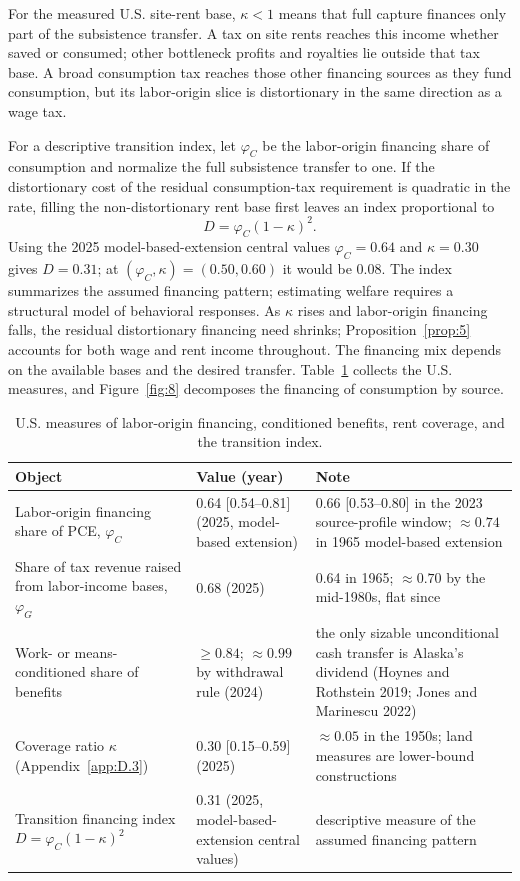 \documentclass[12pt]{article}
\theoremstyle{plain}
\theoremstyle{definition}
\theoremstyle{remark}
\begin{document}
For the measured U.S. site-rent base, $\kappa<1$ means that full capture finances only part of the subsistence transfer. A tax on site rents reaches this income whether saved or consumed; other bottleneck profits and royalties lie outside that tax base. A broad consumption tax reaches those other financing sources as they fund consumption, but its labor-origin slice is distortionary in the same direction as a wage tax.

For a descriptive transition index, let $\varphi_C$ be the labor-origin financing share of consumption and normalize the full subsistence transfer to one. If the distortionary cost of the residual consumption-tax requirement is quadratic in the rate, filling the non-distortionary rent base first leaves an index proportional to
\[
D=\varphi_C(1-\kappa)^2.
\]
Using the 2025 model-based-extension central values $\varphi_C=0.64$ and $\kappa=0.30$ gives $D=0.31$; at $(\varphi_C,\kappa)=(0.50,0.60)$ it would be 0.08. The index summarizes the assumed financing pattern; estimating welfare requires a structural model of behavioral responses. As $\kappa$ rises and labor-origin financing falls, the residual distortionary financing need shrinks; Proposition~\ref{prop:5} accounts for both wage and rent income throughout. The financing mix depends on the available bases and the desired transfer. Table~\ref{tab:D.1} collects the U.S. measures, and Figure~\ref{fig:8} decomposes the financing of consumption by source.

\begin{table}[htbp]
\centering
\caption{U.S. measures of labor-origin financing, conditioned benefits, rent coverage, and the transition index.}
\label{tab:D.1}
{\small
\begin{tabular}{p{5.4cm} p{3.5cm} p{4.8cm}}
\toprule
Object & Value (year) & Note \\
\midrule
\raggedright Labor-origin financing share of PCE, $\varphi_C$ & \raggedright 0.64 [0.54--0.81] (2025, model-based extension) & \raggedright 0.66 [0.53--0.80] in the 2023 source-profile window; $\approx 0.74$ in 1965 model-based extension \tabularnewline
\raggedright Share of tax revenue raised from labor-income bases, $\varphi_G$ & \raggedright 0.68 (2025) & \raggedright 0.64 in 1965; $\approx 0.70$ by the mid-1980s, flat since \tabularnewline
\raggedright Work- or means-conditioned share of benefits & \raggedright $\ge 0.84$; $\approx 0.99$ by withdrawal rule (2024) & \raggedright the only sizable unconditional cash transfer is Alaska's dividend (Hoynes and Rothstein 2019; Jones and Marinescu 2022) \tabularnewline
\raggedright Coverage ratio $\kappa$ (Appendix~\ref{app:D.3}) & \raggedright 0.30 [0.15--0.59] (2025) & \raggedright $\approx 0.05$ in the 1950s; land measures are lower-bound constructions \tabularnewline
\raggedright Transition financing index $D=\varphi_C(1-\kappa)^2$ & \raggedright 0.31 (2025, model-based-extension central values) & \raggedright descriptive measure of the assumed financing pattern \tabularnewline
\bottomrule
\end{tabular}
}
\end{table}
\end{document}
